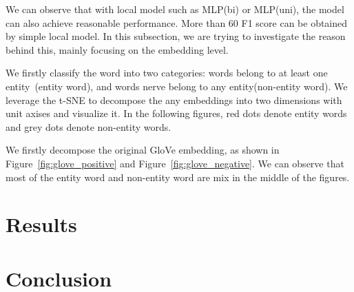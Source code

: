 \documentclass{article}
\begin{document}
We can observe that with local model such as MLP(bi) or MLP(uni), the model can also achieve reasonable performance. More than 60 F1 score can be obtained by simple local model. In this subsection, we are trying to investigate the reason behind this, mainly focusing on the embedding level. 

We firstly classify the word into two categories: words belong to at least one entity~(entity word), and words nerve belong to any entity(non-entity word). We leverage the t-SNE to decompose the any embeddings into two dimensions with unit axises and visualize it. In the following figures, red dots denote entity words and grey dots denote non-entity words. 

We firstly decompose the original GloVe embedding, as shown in Figure~\ref{fig:glove_positive} and Figure~\ref{fig:glove_negative}. We can observe that most of the entity word and non-entity word are mix in the middle of the figures. 



 
\section{Results}



\section{Conclusion}


\nocite{*}




\end{document}
